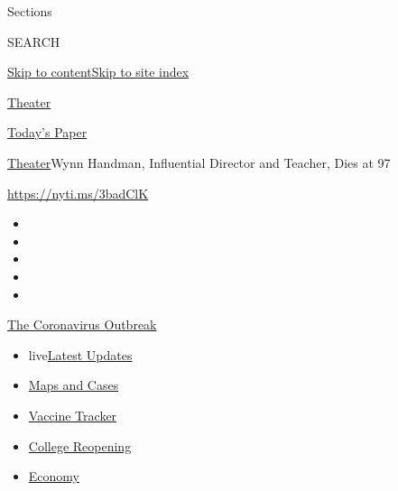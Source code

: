 Sections

SEARCH

\protect\hyperlink{site-content}{Skip to
content}\protect\hyperlink{site-index}{Skip to site index}

\href{https://www.nytimes3xbfgragh.onion/section/theater}{Theater}

\href{https://myaccount.nytimes3xbfgragh.onion/auth/login?response_type=cookie\&client_id=vi}{}

\href{https://www.nytimes3xbfgragh.onion/section/todayspaper}{Today's
Paper}

\href{/section/theater}{Theater}\textbar{}Wynn Handman, Influential
Director and Teacher, Dies at 97

\url{https://nyti.ms/3badClK}

\begin{itemize}
\item
\item
\item
\item
\item
\end{itemize}

\href{https://www.nytimes3xbfgragh.onion/news-event/coronavirus?action=click\&pgtype=Article\&state=default\&region=TOP_BANNER\&context=storylines_menu}{The
Coronavirus Outbreak}

\begin{itemize}
\tightlist
\item
  live\href{https://www.nytimes3xbfgragh.onion/2020/08/04/world/coronavirus-covid-19.html?action=click\&pgtype=Article\&state=default\&region=TOP_BANNER\&context=storylines_menu}{Latest
  Updates}
\item
  \href{https://www.nytimes3xbfgragh.onion/interactive/2020/us/coronavirus-us-cases.html?action=click\&pgtype=Article\&state=default\&region=TOP_BANNER\&context=storylines_menu}{Maps
  and Cases}
\item
  \href{https://www.nytimes3xbfgragh.onion/interactive/2020/science/coronavirus-vaccine-tracker.html?action=click\&pgtype=Article\&state=default\&region=TOP_BANNER\&context=storylines_menu}{Vaccine
  Tracker}
\item
  \href{https://www.nytimes3xbfgragh.onion/2020/08/02/us/covid-college-reopening.html?action=click\&pgtype=Article\&state=default\&region=TOP_BANNER\&context=storylines_menu}{College
  Reopening}
\item
  \href{https://www.nytimes3xbfgragh.onion/live/2020/08/03/business/stock-market-today-coronavirus?action=click\&pgtype=Article\&state=default\&region=TOP_BANNER\&context=storylines_menu}{Economy}
\end{itemize}

